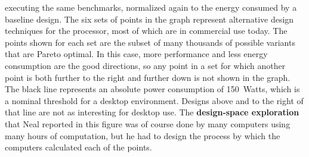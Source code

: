 executing the same benchmarks, normalized
again to the energy consumed by a baseline design.  The six sets of
points in the graph represent alternative design techniques for the
processor, most of which are in commercial use today.  The points
shown for each set are the subset of many thousands of possible variants
that are Pareto optimal.  In this case, more performance and less energy
consumption are the good directions, so any point in a set for which
another point is both further to the right and further down is not
shown in the graph.  The black line represents an absolute power
consumption of 150~Watts, which is a nominal threshold for a desktop
environment.  Designs above and to the right of that line are not
as interesting for desktop use.  The {\bf design-space exploration} that
Neal reported in this figure was of course done by many computers using
many hours of computation, but he had to design the process by which the
computers calculated each of the points.

\vfill

\pagebreak

